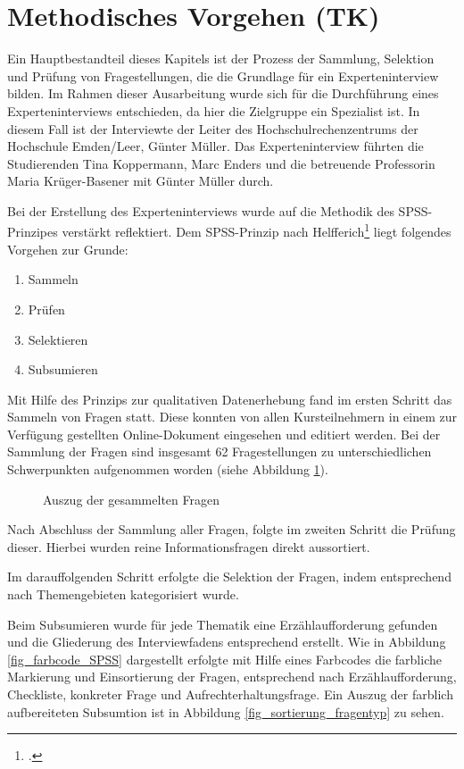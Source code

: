 \section{Methodisches Vorgehen (TK)}
Ein Hauptbestandteil dieses Kapitels ist der Prozess der Sammlung, Selektion und Prüfung von Fragestellungen, die die Grundlage für ein Experteninterview bilden. Im Rahmen dieser Ausarbeitung wurde sich für die Durchführung eines Experteninterviews entschieden, da hier die Zielgruppe ein Spezialist ist. In diesem Fall ist der Interviewte der Leiter des Hochschulrechenzentrums der Hochschule Emden/Leer, Günter Müller. Das Experteninterview führten die Studierenden Tina Koppermann, Marc Enders und die betreuende Professorin Maria Krüger-Basener mit Günter Müller durch. 

Bei der Erstellung des Experteninterviews wurde auf die Methodik des SPSS-Prinzipes verstärkt reflektiert. Dem SPSS-Prinzip nach Helfferich\footcite[Vgl.][182 ff.]{helfferich_2009} liegt folgendes Vorgehen zur Grunde:

\begin{enumerate}
	\item Sammeln
	\item Prüfen
	\item Selektieren
	\item Subsumieren		
\end{enumerate}

Mit Hilfe des Prinzips zur qualitativen Datenerhebung fand im ersten Schritt das Sammeln von Fragen statt. Diese konnten von allen Kursteilnehmern in einem zur Verfügung gestellten Online-Dokument eingesehen und editiert werden. Bei der Sammlung der Fragen sind insgesamt 62 Fragestellungen zu unterschiedlichen Schwerpunkten aufgenommen worden (siehe Abbildung \ref{fig_auszug_fragen_sammeln}).

\begin{figure}[h!]
	\centering
	\caption{Auszug der gesammelten Fragen}
	\label{fig_auszug_fragen_sammeln}
\end{figure}

Nach Abschluss der Sammlung aller Fragen, folgte im zweiten Schritt die Prüfung dieser. Hierbei wurden reine Informationsfragen direkt aussortiert. 

Im darauffolgenden Schritt erfolgte die Selektion der Fragen, indem entsprechend nach Themengebieten kategorisiert wurde. 

Beim Subsumieren wurde für jede Thematik eine Erzählaufforderung gefunden und die Gliederung des Interviewfadens entsprechend erstellt. Wie in Abbildung \ref{fig_farbcode_SPSS} dargestellt erfolgte mit Hilfe eines Farbcodes die farbliche Markierung und Einsortierung der Fragen, entsprechend nach Erzählaufforderung, Checkliste, konkreter Frage und Aufrechterhaltungsfrage. Ein Auszug der farblich aufbereiteten Subsumtion ist in Abbildung \ref{fig_sortierung_fragentyp} zu sehen.

